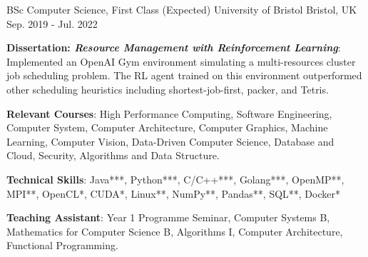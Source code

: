 

\begin{cventries}

  \cventry
    {BSc Computer Science, First Class (Expected)} %
    {University of Bristol} %
    {Bristol, UK} %
    {Sep. 2019 - Jul. 2022} %
    {
      \begin{cvitems} %
      \item {\textbf{Dissertation: \textit{Resource Management with Reinforcement Learning}}: Implemented an OpenAI Gym environment simulating a multi-resources cluster job scheduling problem. The RL agent trained on this environment outperformed other scheduling heuristics including shortest-job-first, packer, and Tetris.}
        \item {\textbf{Relevant Courses}: High Performance Computing, Software Engineering, Computer System, Computer Architecture, Computer Graphics, Machine Learning, Computer Vision, Data-Driven Computer Science, Database and Cloud, Security, Algorithms and Data Structure.}
        \item {\textbf{Technical Skills}: Java***, Python***, C/C++***, Golang***, OpenMP**, MPI**, OpenCL*, CUDA*, Linux**, NumPy**, Pandas**, SQL**, Docker*}
        \item {\textbf{Teaching Assistant}: Year 1 Programme Seminar, Computer Systems B, Mathematics for Computer Science B, Algorithms I, Computer Architecture, Functional Programming.}
      \end{cvitems}
    }
    

\end{cventries}
